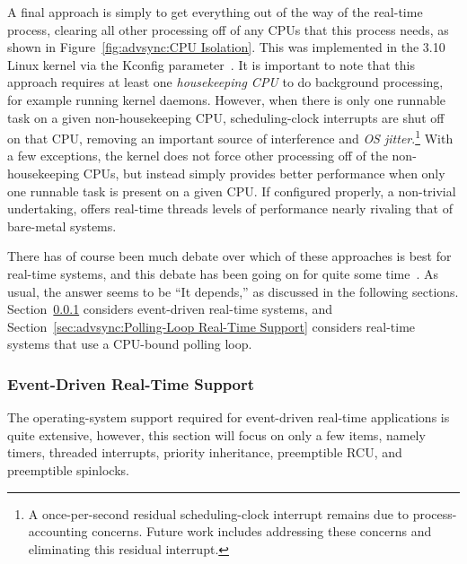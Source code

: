 A final approach is simply to get everything out of the way of the
real-time process, clearing all other processing off of any CPUs that
this process needs, as shown in Figure~\ref{fig:advsync:CPU Isolation}.
This was implemented in the 3.10 Linux kernel via the 
Kconfig parameter~\cite{FredericWeisbecker2013nohz}.
It is important to note that this approach requires at least one
\emph{housekeeping CPU} to do background processing, for example running
kernel daemons.
However, when there is only one runnable task on a given non-housekeeping CPU,
scheduling-clock interrupts are shut off on that CPU, removing an important
source of interference and \emph{OS jitter}.\footnote{
	A once-per-second residual scheduling-clock interrupt remains
	due to process-accounting concerns.
	Future work includes addressing these concerns and eliminating
	this residual interrupt.}
With a few exceptions, the kernel does not force other processing off of the
non-housekeeping CPUs, but instead simply provides better performance
when only one runnable task is present on a given CPU.
If configured properly, a non-trivial undertaking, 
offers real-time threads levels of performance nearly rivaling that of
bare-metal systems.

There has of course been much debate over which of these approaches
is best for real-time systems, and this debate has been going on for
quite some
time~\cite{JonCorbet2004RealTimeLinuxPart1,JonCorbet2004RealTimeLinuxPart2}.
As usual, the answer seems to be ``It depends,'' as discussed in the
following sections.
Section~\ref{sec:advsync:Event-Driven Real-Time Support}
considers event-driven real-time systems, and
Section~\ref{sec:advsync:Polling-Loop Real-Time Support}
considers real-time systems that use a CPU-bound polling loop.

\subsubsection{Event-Driven Real-Time Support}
\label{sec:advsync:Event-Driven Real-Time Support}

The operating-system support required for event-driven real-time
applications is quite extensive, however, this section will focus
on only a few items, namely
timers,
threaded interrupts,
priority inheritance,
preemptible RCU,
and
preemptible spinlocks.

